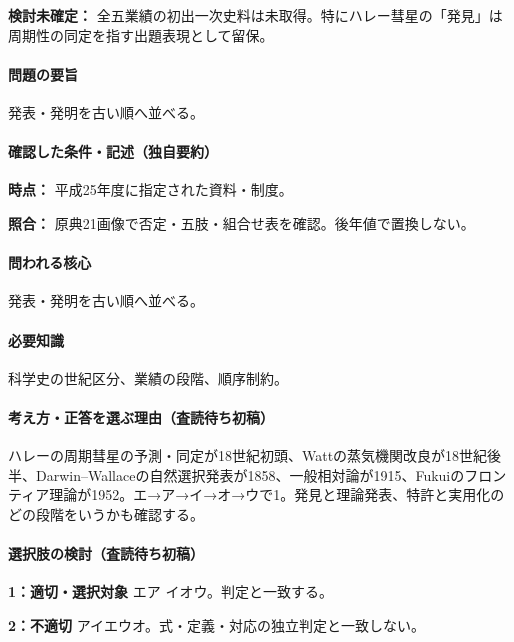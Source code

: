 \par\textbf{検討未確定：} 全五業績の初出一次史料は未取得。特にハレー彗星の「発見」は周期性の同定を指す出題表現として留保。

\paragraph{問題の要旨} 発表・発明を古い順へ並べる。

\paragraph{確認した条件・記述（独自要約）}\mbox{}\par

\noindent\textbf{時点：} 平成25年度に指定された資料・制度。\par

\noindent\textbf{照合：} 原典21画像で否定・五肢・組合せ表を確認。後年値で置換しない。\par

\paragraph{問われる核心} 発表・発明を古い順へ並べる。

\paragraph{必要知識} 科学史の世紀区分、業績の段階、順序制約。

\paragraph{考え方・正答を選ぶ理由（査読待ち初稿）} ハレーの周期彗星の予測・同定が18世紀初頭、Wattの蒸気機関改良が18世紀後半、Darwin–Wallaceの自然選択発表が1858、一般相対論が1915、Fukuiのフロンティア理論が1952。エ→ア→イ→オ→ウで1。発見と理論発表、特許と実用化のどの段階をいうかも確認する。

\paragraph{選択肢の検討（査読待ち初稿）}\mbox{}\par

\noindent\textbf{1：適切・選択対象} エア イオウ。判定と一致する。\par

\noindent\textbf{2：不適切} アイエウオ。式・定義・対応の独立判定と一致しない。\par

